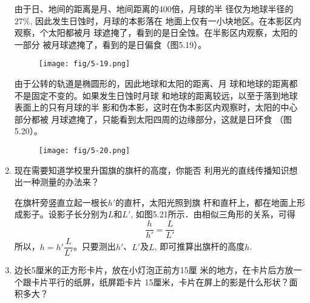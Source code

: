 \begin{enumerate}
\begin{solution}
由于日、地间的距离是月、地间距离的400倍，月球的半
径仅为地球半径的27\%, 因此发生日蚀时，月球的本影落在
地面上仅有一小块地区。在本影区内观察，个太阳都被月
球遮掩了，看到的是日全蚀。在半影区内观察，太阳的一部分
被月球遮掩了，看到的是日偏食（图5.19）。 
    \begin{figure}[htp]
        \centering
        \texttt{[image: fig/5-19.png]}
        \caption{}
    \end{figure}    

由于公转的轨道是椭圆形的，因此地球和太阳的距离、月
球和地球的距离都不是固定不变的。如果发生日蚀时月球
和地球的距离较远，以至于落到地球表面上的只有月球的半
影和伪本影，这时在伪本影区内观察时，太阳的中心部分都被
月球遮掩了，只能看到太阳四周的边缘部分，这就是日环食
（图5.20）。    
\begin{figure}[htp]
    \centering
    \texttt{[image: fig/5-20.png]}
    \caption{}
\end{figure}  
\end{solution}

\item 现在需要知道学校里升国旗的旗杆的高度，你能否
利用光的直线传播知识想出一种测量的办法来？

\begin{solution}
    在旗杆旁竖直立起一根长$h'$的直杆，太阳光照到旗
    杆和直杆上，都在地面上形成影子。设影子长分别为$L$和$L'$, 
    如图5.21所示．由相似三角形的关系，可得
    \[\frac{h}{h'}=\frac{L}{L'}\]
    所以，$h=h'\dfrac{L}{L'}$。只要测出$h'$、$L'$及$L$, 即可推算出旗杆的高度$h$.
\begin{figure}[htp]
    \centering
{}
    \caption{}
\end{figure}
\end{solution}

\item 边长5厘米的正方形卡片，放在小灯泡正前方15厘
米的地方，在卡片后方放一个跟卡片平行的纸屏，纸屏距卡片
15厘米，卡片在屏上的影是什么形状？面积多大？


\end{enumerate}
